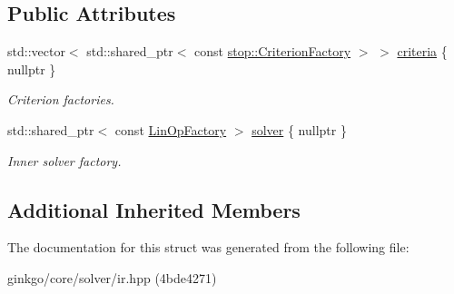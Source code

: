 \subsection*{Public Attributes}
\begin{DoxyCompactItemize}
\item 
\mbox{\label{structgko_1_1solver_1_1Ir_1_1parameters__type_af0f31d5343e290f7974cd780c7be27cc}} 
std\+::vector$<$ std\+::shared\+\_\+ptr$<$ const \hyperlink{group__stop_gab12a51109c50b35ec36dc5a393d6a9a0}{stop\+::\+Criterion\+Factory} $>$ $>$ \hyperlink{structgko_1_1solver_1_1Ir_1_1parameters__type_af0f31d5343e290f7974cd780c7be27cc}{criteria} \{ nullptr \}
\begin{DoxyCompactList}\small\item\em Criterion factories. \end{DoxyCompactList}\item 
\mbox{\label{structgko_1_1solver_1_1Ir_1_1parameters__type_a787aaabdad4c273ef2ec9ff93672db82}} 
std\+::shared\+\_\+ptr$<$ const \hyperlink{classgko_1_1LinOpFactory}{Lin\+Op\+Factory} $>$ \hyperlink{structgko_1_1solver_1_1Ir_1_1parameters__type_a787aaabdad4c273ef2ec9ff93672db82}{solver} \{ nullptr \}
\begin{DoxyCompactList}\small\item\em Inner solver factory. \end{DoxyCompactList}\end{DoxyCompactItemize}
\subsection*{Additional Inherited Members}


The documentation for this struct was generated from the following file\+:\begin{DoxyCompactItemize}
\item 
ginkgo/core/solver/ir.\+hpp (4bde4271)\end{DoxyCompactItemize}
